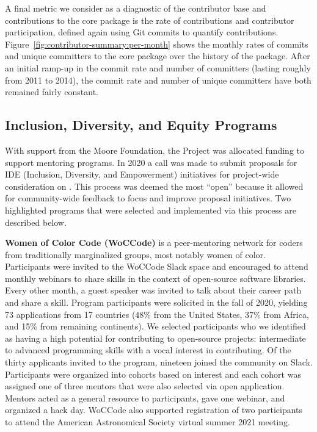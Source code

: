 \documentclass[modern]{aastex631}
\newcommand{\secauthor}[1]{{\color{blue}Author:~\textit{#1}}}
\begin{document}
A final metric we consider as a diagnostic of the contributor base and
contributions to the \astropypkg core package is the rate of contributions and
contributor participation, defined again using Git commits to quantify
contributions.
Figure~\ref{fig:contributor-summary:per-month} shows the monthly rates of
commits and unique committers to the \astropypkg core package over the history
of the package.
After an initial ramp-up in the commit rate and number of committers (lasting
roughly from 2011 to 2014), the commit rate and number of unique committers have
both remained fairly constant.


\subsection{Inclusion, Diversity, and Equity Programs} \label{sec:project-ide}


With support from the Moore Foundation, the \astropy Project was
allocated funding to support mentoring programs. In 2020 a call was
made to submit proposals for IDE (Inclusion, Diversity, and
Empowerment) initiatives for project-wide consideration on
\github. This process was deemed the most ``open'' because it allowed
for community-wide feedback to focus and improve proposal
initiatives. Two highlighted programs that were selected and implemented via
this process are described below.


\textbf{Women of Color Code (WoCCode)} is a peer-mentoring network for
coders from traditionally marginalized groups, most notably women of
color. Participants were invited to the WoCCode Slack space and
encouraged to attend monthly webinars to share skills in the context
of open-source software libraries. Every other month, a guest speaker
was invited to talk about their career path and share a skill. Program
participants were solicited in the fall of 2020, yielding 73
applications from 17 countries (48\% from the United States, 37\% from
Africa, and 15\% from remaining continents). We selected participants
who we identified as having a high potential for contributing to
open-source projects: intermediate to advanced programming skills with a
vocal interest in contributing. Of the thirty applicants invited to
the program, nineteen joined the community on Slack. Participants were
organized into cohorts based on interest and each cohort was assigned
one of three mentors that were also selected via open
application. Mentors acted as a general resource to participants, gave
one webinar, and organized a hack day. WoCCode also supported
registration of two participants to attend the American Astronomical
Society virtual summer 2021 meeting.
\end{document}

